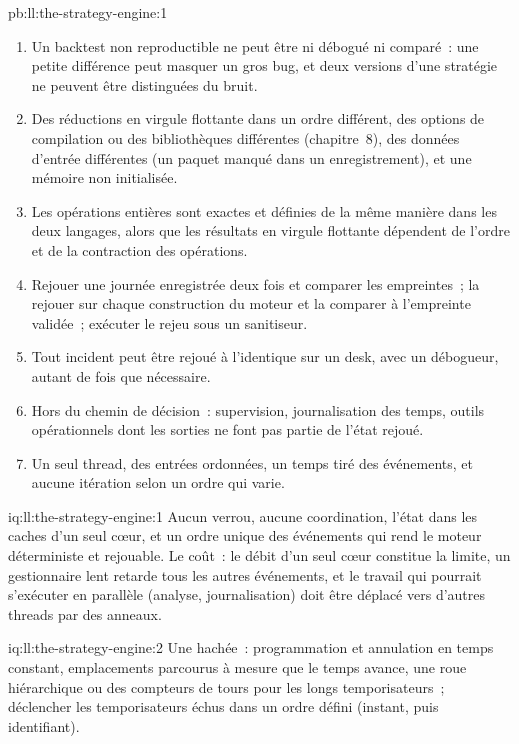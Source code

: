 \begin{solution}{pb:ll:the-strategy-engine:1}
\begin{enumerate}
un ordre de hachage à graine fixée, 49 avec deux threads sur une même file, 100 avec les trois, et un après les corrections (et un pour le moteur
de la firme).
\item Un backtest non reproductible ne peut être ni débogué ni comparé~: une petite différence peut masquer un gros bug, et deux
versions d'une stratégie ne peuvent être distinguées du bruit.
\item Des réductions en virgule flottante dans un ordre différent, des options de compilation ou des bibliothèques différentes (chapitre~8), des données d'entrée différentes
(un paquet manqué dans un enregistrement), et une mémoire non initialisée.
\item Les opérations entières sont exactes et définies de la même manière dans les deux langages, alors que les résultats en virgule flottante dépendent de l'ordre
et de la contraction des opérations.
\item Rejouer une journée enregistrée deux fois et comparer les empreintes~; la rejouer sur chaque construction du moteur et la comparer à l'empreinte
validée~; exécuter le rejeu sous un sanitiseur.
\item Tout incident peut être rejoué à l'identique sur un desk, avec un débogueur, autant de fois que nécessaire.
\item Hors du chemin de décision~: supervision, journalisation des temps, outils opérationnels dont les sorties ne font pas partie de l'état
rejoué.
\item Un seul thread, des entrées ordonnées, un temps tiré des événements, et aucune itération selon un ordre qui varie.
\end{enumerate}
\end{solution}

\begin{solution}{iq:ll:the-strategy-engine:1}
Aucun verrou, aucune coordination, l'état dans les caches d'un seul cœur, et un ordre unique des événements qui rend le moteur déterministe
et rejouable. Le coût~: le débit d'un seul cœur constitue la limite, un gestionnaire lent retarde tous les autres événements, et le travail qui pourrait s'exécuter
en parallèle (analyse, journalisation) doit être déplacé vers d'autres threads par des anneaux.
\end{solution}

\begin{solution}{iq:ll:the-strategy-engine:2}
Une  hachée~: programmation et annulation en temps constant, emplacements parcourus à mesure que le temps avance, une roue hiérarchique ou
des compteurs de tours pour les longs temporisateurs~; déclencher les temporisateurs échus dans un ordre défini (instant, puis identifiant).
\end{solution}

